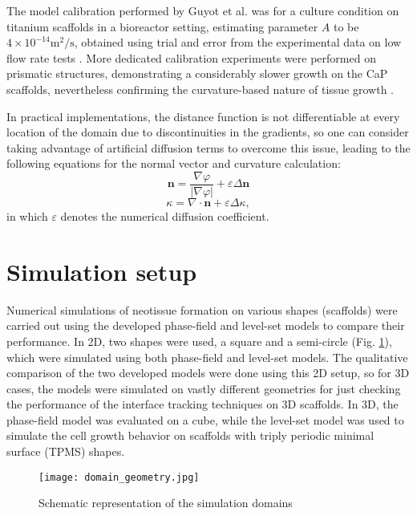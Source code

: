 The model calibration performed by Guyot et al. \cite{Guyot2014} was for a culture condition on titanium scaffolds in a bioreactor setting, estimating parameter $A$ to be $4\times10^{-14} \text{m}^2/\text{s}$, obtained using trial and error from the experimental data on low flow rate tests \cite{Papantoniou2014}.
More dedicated calibration experiments were performed on prismatic structures, demonstrating a considerably slower growth on the CaP scaffolds, nevertheless confirming the curvature-based nature of tissue growth \cite{Hede2021}.

In practical implementations, the distance function is not differentiable at every location of the domain due to discontinuities in the gradients, so one can consider taking advantage of artificial diffusion terms to overcome this issue, leading to the following equations for the normal vector and curvature calculation:
\begin{equation}
\boldsymbol{n}=\frac{\nabla \varphi}{|\nabla \varphi|}+\varepsilon \Delta \boldsymbol{n}
\end{equation}
\begin{equation}
\kappa=\nabla \cdot \boldsymbol{n}+\varepsilon \Delta \kappa,
\end{equation}
in which $\varepsilon$ denotes the numerical diffusion coefficient.


\section{Simulation setup}


Numerical simulations of neotissue formation on various shapes (scaffolds) were carried out using the developed phase-field and level-set models to compare their performance. In 2D, two shapes were used, a square and a semi-circle (Fig. \ref{fig:tissue_domain_geometry}), which were simulated using both phase-field and level-set models. The qualitative comparison of the two developed models were done using this 2D setup, so for 3D cases, the models were simulated on vastly different geometries for just checking the performance of the interface tracking techniques on 3D scaffolds. In 3D, the phase-field model was evaluated on a cube, while the level-set model was used to simulate the cell growth behavior on scaffolds with triply periodic minimal surface (\gls{TPMS}) shapes.

\begin{figure}
\centering
\medskip
\texttt{[image: domain\_geometry.jpg]}
\caption[Schematic representation of the simulation domains]{Schematic representation of the simulation domains}
\label{fig:tissue_domain_geometry}
\end{figure}

